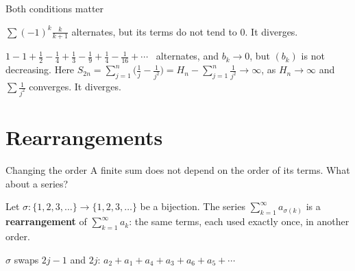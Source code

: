 \documentclass{wosm-slides}
\begin{document}
\begin{frame}{Both conditions matter}
  \begin{warning}[$b_k \to 0$]
    $\sum (-1)^k \frac{k}{k+1}$ alternates, but its terms do not tend to $0$. It diverges.
  \end{warning}
  \pause
  \begin{warning}[$(b_k)$ decreasing]
    $1 - 1 + \frac12 - \frac14 + \frac13 - \frac19 + \frac14 - \frac1{16} + \cdots$
    \ alternates, and $b_k \to 0$, but $(b_k)$ is not decreasing. Here
    $S_{2n} = \sum_{j=1}^{n} \bigl(\frac1j - \frac1{j^2}\bigr) = H_n - \sum_{j=1}^{n} \frac1{j^2}
    \to \infty$, as $H_n \to \infty$ and $\sum \frac{1}{j^2}$ converges. It diverges.
  \end{warning}
\end{frame}


\section{Rearrangements}

\begin{frame}{Changing the order}
  A finite sum does not depend on the order of its terms. What about a series?
  \begin{definition}[Rearrangement]
    Let $\sigma\colon \{1, 2, 3, \dots\} \to \{1, 2, 3, \dots\}$ be a bijection.
    The series $\sum_{k=1}^\infty a_{\sigma(k)}$ is a \textbf{rearrangement} of
    $\sum_{k=1}^\infty a_k$: the same terms, each used exactly once, in another order.
  \end{definition}
  \pause
  \begin{example}
    $\sigma$ swaps $2j-1$ and $2j$:\quad
    $a_2 + a_1 + a_4 + a_3 + a_6 + a_5 + \cdots$
  \end{example}
\end{frame}
\end{document}
